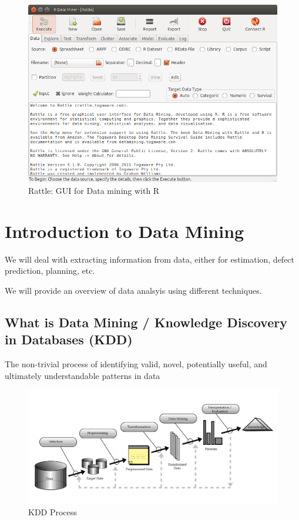 \documentclass[]{book}
\begin{document}
\begin{figure}[htbp]
\centering
\includegraphics{./figures/rattle.png}
\caption{Rattle: GUI for Data mining with R}
\end{figure}

\part{Introduction to Data
Mining}\label{part-introduction-to-data-mining}

We will deal with extracting information from data, either for
estimation, defect prediction, planning, etc.

We will provide an overview of data analsyis using different techniques.

\chapter{What is Data Mining / Knowledge Discovery in Databases
(KDD)}\label{what-is-data-mining-knowledge-discovery-in-databases-kdd}

The non-trivial process of identifying valid, novel, potentially useful,
and ultimately understandable patterns in data \citep{FayyadPS1996}

\begin{figure}[htbp]
\centering
\includegraphics{figures/Fayyad96kdd-process.png}
\caption{KDD Process}
\end{figure}
\end{document}
